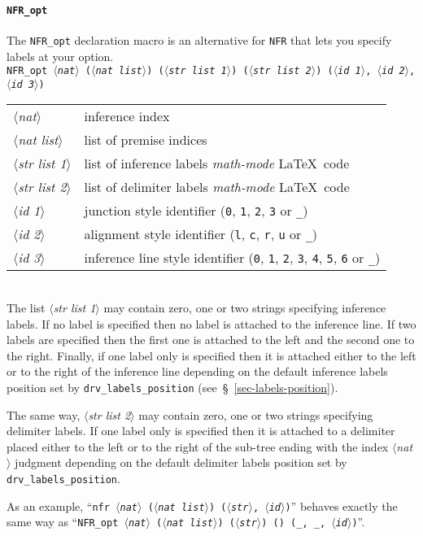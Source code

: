 \documentclass[twoside,11pt]{article}
\newcommand{\param}[1]{\textrm{\textit{$\langle$#1\/$\rangle$}}}
\begin{document}
\paragraph{\texttt{NFR\_opt}}
%
%
The \texttt{NFR\_opt} declaration macro is an alternative for \texttt{NFR}
that lets you specify labels at your option.\\[1ex]
\texttt{NFR\_opt
\param{nat}
(\param{nat list})
(\param{str list 1})
(\param{str list 2})
(\param{id 1}, \param{id 2}, \param{id 3})}
\begin{tabular}{ll}
\param{nat}&		inference index\\
\param{nat list}&	list of premise indices\\
\param{str list 1}&	list of inference labels \emph{math-mode}
			\LaTeX\ code\\
\param{str list 2}&	list of delimiter labels \emph{math-mode}
			\LaTeX\ code\\
\param{id 1}&		junction style identifier ({\tt0}, {\tt1}, {\tt2},
			{\tt3} or {\tt\_})\\
\param{id 2}&		alignment style identifier ({\tt l}, {\tt c}, {\tt r},
			{\tt u} or {\tt\_})\\
\param{id 3}&		inference line style identifier ({\tt0}, {\tt1},
			{\tt2},	{\tt3}, {\tt4}, {\tt5}, {\tt6} or {\tt\_})
\end{tabular}\\[1ex]
%
%
The list \param{str list 1} may contain zero, one or two
strings specifying inference labels. If no label is specified then no label
is attached to the inference line. If two labels are specified then the first
one is attached to the left and the second one to the right. Finally, if one
label only is specified then it is attached either to the left or to the right
of the inference line depending on the default inference labels position set by
\texttt{drv\_labels\_position} (see~\S~\ref{sec-labels-position}).

The same way, \param{str list 2} may contain zero, one or two strings
specifying delimiter labels. If one label only is specified then it is attached
to a delimiter placed either to the left or to the right of the sub-tree ending
with the index \param{nat} judgment depending on the default delimiter labels
position set by \texttt{drv\_labels\_position}.

As an example, ``\texttt{nfr \param{nat} (\param{nat list})
(\param{str}, \param{id})}'' behaves exactly the same way as
``\texttt{NFR\_opt \param{nat} (\param{nat list}) (\param{str}) ()
(\_, \_, \param{id})}''.
%
%
\end{document}
